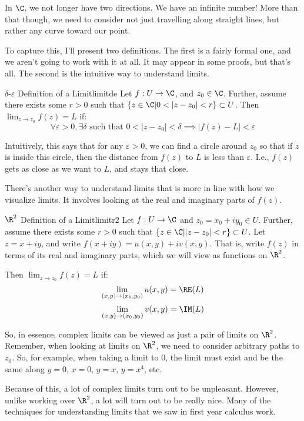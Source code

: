 In $\C$, we not longer have two directions. We have an infinite number! More than that though, we need to consider not just travelling along straight lines, but rather any curve toward our point.

To capture this, I'll present two definitions. The first is a fairly formal one, and we aren't going to work with it at all. It may appear in some proofs, but that's all. The second is the intuitive way to understand limits.

\begin{defbo}{$\delta$-$\varepsilon$ Definition of a Limit}{limitde}
Let $f:U\rightarrow \C$, and $z_0 \in \C$. Further, assume there exists some $r > 0$ such that $\{z\in \C| 0 < |z-z_0| < r\} \subset U$. Then $\lim_{z\rightarrow z_0} f(z) = L$ if:
$$\forall \varepsilon > 0, \exists \delta \text{ such that } 0 < |z-z_0| < \delta \implies |f(z) - L| < \varepsilon$$
\end{defbo}

Intuitively, this says that for any $\varepsilon > 0$, we can find a circle around $z_0$ so that if $z$ is inside this circle, then the distance from $f(z)$ to $L$ is less than $\varepsilon$. I.e., $f(z)$ gets as close as we want to $L$, and stays that close.

There's another way to understand limits that is more in line with how we visualize limits. It involves looking at the real and imaginary parts of $f(z)$.

\begin{defbo}{$\R^2$ Definition of a Limit}{limitr2}
Let $f:U\rightarrow \C$ and $z_0 = x_0 + iy_0 \in U$. Further, assume there exists some $r > 0$ such that $\{z\in \C| |z-z_0| < r\} \subset U$. Let $z = x+ iy$, and write $f(x + iy) = u(x,y) + iv(x,y)$. That is, write $f(z)$ in terms of its real and imaginary parts, which we will view as functions on $\R^2$.

Then $\lim_{z\rightarrow z_0} f(z) = L$ if:
$$\lim_{(x,y)\rightarrow (x_0,y_0)} u(x,y) = \RE(L)$$
$$\lim_{(x,y)\rightarrow (x_0,y_0)} v(x,y) = \IM(L)$$
\end{defbo}

So, in essence, complex limits can be viewed as just a pair of limits on $\R^2$. Remember, when looking at limits on $\R^2$, we need to consider arbitrary paths to $z_0$. So, for example, when taking a limit to $0$, the limit must exist and be the same along $y = 0$, $x = 0$, $y = x$, $y = x^4$, etc. 

Because of this, a lot of complex limits turn out to be unpleasant. However, unlike working over $\R^2$, a lot will turn out to be really nice. Many of the techniques for understanding limits that we saw in first year calculus work.

